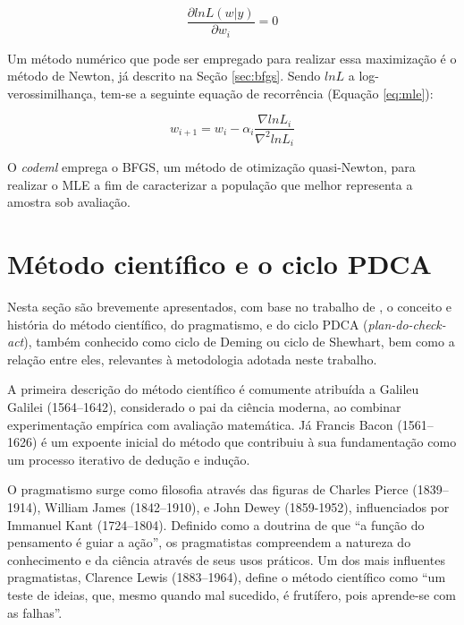 \documentclass[cic,tc]{iiufrgs}
\begin{document}
\begin{equation}
\label{eq:dl}
\frac{\partial ln L(w|y)}{\partial w_i} = 0
\end{equation}


Um método numérico que pode ser empregado para realizar essa maximização é o
método de Newton, já descrito na Seção \ref{sec:bfgs}. Sendo $lnL$ a
log-verossimilhança, tem-se a seguinte equação de recorrência (Equação
\ref{eq:mle}):

\begin{equation}
\label{eq:mle}
w_{i+1} = w_i - \alpha_i \frac{\nabla lnL_i}{\nabla^2 lnL_i}
\end{equation}

O \textit{codeml} emprega o BFGS, um método de otimização quasi-Newton, para
realizar o MLE a fim de caracterizar a população que melhor representa a
amostra sob avaliação.


\section{Método científico e o ciclo PDCA}
\label{sec:pdca}

Nesta seção são brevemente apresentados, com base no trabalho de
\cite{moen2006evolution}, o conceito e história do método científico, do
pragmatismo, e do ciclo PDCA (\textit{plan-do-check-act}), também conhecido
como ciclo de Deming ou ciclo de Shewhart, bem como a relação entre eles,
relevantes à metodologia adotada neste trabalho.

A primeira descrição do método científico é comumente atribuída a Galileu
Galilei (1564--1642), considerado o pai da ciência moderna, ao combinar
experimentação empírica com avaliação matemática. Já Francis Bacon (1561--1626)
é um expoente inicial do método que contribuiu à sua fundamentação como um
processo iterativo de dedução e indução.

O pragmatismo surge como filosofia através das figuras de Charles Pierce
(1839--1914), William James (1842--1910), e John Dewey (1859-1952),
influenciados por Immanuel Kant (1724--1804). Definido como a doutrina de que
``a função do pensamento é guiar a ação'', os pragmatistas compreendem a
natureza do conhecimento e da ciência através de seus usos práticos. Um dos
mais influentes pragmatistas, Clarence Lewis (1883--1964), define o método
científico como ``um teste de ideias, que, mesmo quando mal sucedido, é
frutífero, pois aprende-se com as falhas''.
\end{document}
